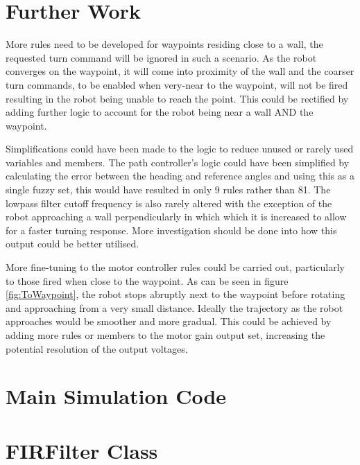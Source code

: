 \documentclass[10pt]{article}
\begin{document}
\section{Further Work}
More rules need to be developed for waypoints residing close to a wall, the requested turn command will be ignored in such a scenario.
As the robot converges on the waypoint, it will come into proximity of the wall and the coarser turn commands, to be enabled when very-near to the waypoint, will not be fired resulting in the robot being unable to reach the point.
This could be rectified by adding further logic to account for the robot being near a wall AND the waypoint. 

\medskip
Simplifications could have been made to the logic to reduce unused or rarely used variables and members. 
The path controller's logic could have been simplified by calculating the error between the heading and reference angles and using this as a single fuzzy set, this would have resulted in only 9 rules rather than 81. 
The lowpass filter cutoff frequency is also rarely altered with the exception of the robot approaching a wall perpendicularly in which which it is increased to allow for a faster turning response.
More investigation should be done into how this output could be better utilised. 

\medskip
More fine-tuning to the motor controller rules could be carried out, particularly to those fired when close to the waypoint.
As can be seen in figure \ref{fig:ToWaypoint}, the robot stops abruptly next to the waypoint before rotating and approaching from a very small distance.
Ideally the trajectory as the robot approaches would be smoother and more gradual.
This could be achieved by adding more rules or members to the motor gain output set, increasing the potential resolution of the output voltages.  

\pagebreak



\pagebreak
\appendix
\section{Main Simulation Code}

\pagebreak
\section{FIRFilter Class}

\end{document}
